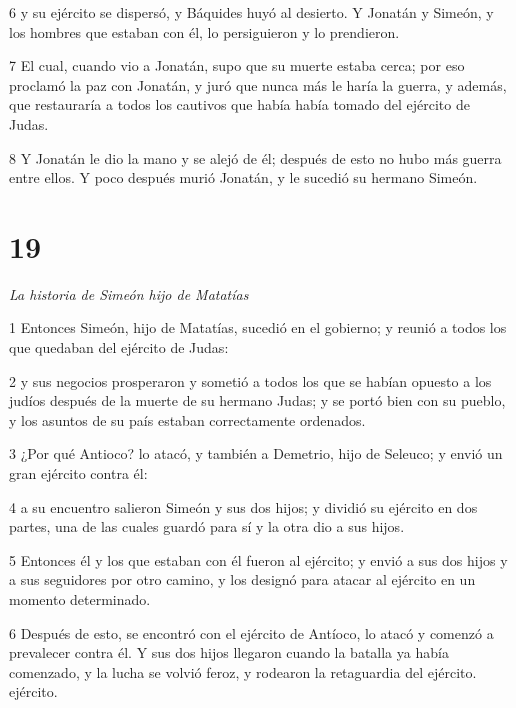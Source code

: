 \par 6 y su ejército se dispersó, y Báquides huyó al desierto. Y Jonatán y Simeón, y los hombres que estaban con él, lo persiguieron y lo prendieron.

\par 7 El cual, cuando vio a Jonatán, supo que su muerte estaba cerca; por eso proclamó la paz con Jonatán, y juró que nunca más le haría la guerra, y además, que restauraría a todos los cautivos que había había tomado del ejército de Judas.

\par 8 Y Jonatán le dio la mano y se alejó de él; después de esto no hubo más guerra entre ellos. Y poco después murió Jonatán, y le sucedió su hermano Simeón.


\chapter{19}

\par \textit{La historia de Simeón hijo de Matatías}

\par 1 Entonces Simeón, hijo de Matatías, sucedió en el gobierno; y reunió a todos los que quedaban del ejército de Judas:

\par 2 y sus negocios prosperaron y sometió a todos los que se habían opuesto a los judíos después de la muerte de su hermano Judas; y se portó bien con su pueblo, y los asuntos de su país estaban correctamente ordenados.

\par 3 ¿Por qué Antioco? lo atacó, y también a Demetrio, hijo de Seleuco; y envió un gran ejército contra él:

\par 4 a su encuentro salieron Simeón y sus dos hijos; y dividió su ejército en dos partes, una de las cuales guardó para sí y la otra dio a sus hijos.

\par 5 Entonces él y los que estaban con él fueron al ejército; y envió a sus dos hijos y a sus seguidores por otro camino, y los designó para atacar al ejército en un momento determinado.

\par 6 Después de esto, se encontró con el ejército de Antíoco, lo atacó y comenzó a prevalecer contra él. Y sus dos hijos llegaron cuando la batalla ya había comenzado, y la lucha se volvió feroz, y rodearon la retaguardia del ejército. ejército.

